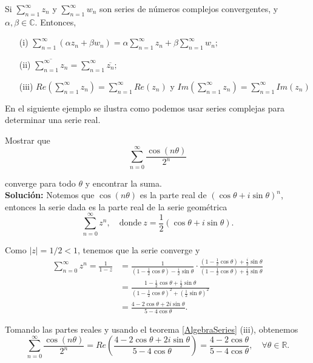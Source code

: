 \begin{teorema}\label{AlgebraSeries}
Si $\sum\limits_{n=1}^{\infty} z_n$ y $\sum\limits_{n=1}^{\infty} w_n$ son series de números complejos convergentes, y $\alpha,\beta \in \mathbb{C}$. Entonces,
\begin{itemize}
    \item[(i)] $\sum\limits_{n=1}^{\infty} (\alpha z_n + \beta w_n) = \alpha \sum\limits_{n=1}^{\infty} z_n + \beta \sum\limits_{n=1}^{\infty} w_n;$
    
    \item[(ii)] $\overline{\sum\limits_{n=1}^{\infty} z_n} =  \sum\limits_{n=1}^{\infty} \overline{z_n};$
    
    \item[(iii)] $Re\left(\sum\limits_{n=1}^{\infty} z_n\right) =\sum\limits_{n=1}^{\infty} Re(z_n)$ y $Im\left(\sum\limits_{n=1}^{\infty} z_n\right) =\sum\limits_{n=1}^{\infty} Im(z_n)$
\end{itemize}
\end{teorema}

En el siguiente ejemplo se ilustra como podemos usar series complejas para determinar una serie real.

\begin{ejemplo}
Mostrar que 
$$\sum_{n=0}^{\infty} \frac{\cos(n\theta)}{2^n}$$

converge para todo $\theta$ y encontrar la suma.
\\

\textbf{Solución:} Notemos que $\cos(n\theta)$ es la parte real de $(\cos\theta + i \sin \theta)^n$, entonces la serie dada es la parte real de la serie geométrica
$$\sum_{n=0}^{\infty} z^n, \quad \mbox{donde} ~ z = \frac{1}{2}(\cos \theta + i \sin \theta).$$

Como $|z| = 1/2 < 1$, tenemos que la serie converge y
\begin{align*}
 \sum_{n=0}^{\infty} z^n = \frac{1}{1-z} &= \frac{1}{\left(1 - \frac{1}{2} \cos \theta \right) - \frac{i}{2} \sin \theta } \cdot \frac{\left(1 - \frac{1}{2} \cos \theta \right) + \frac{i}{2} \sin \theta}{\left(1 - \frac{1}{2} \cos \theta \right) + \frac{i}{2} \sin \theta} \\
 &= \frac{1 - \frac{1}{2} \cos \theta  + \frac{i}{2} \sin \theta}{\left(1 - \frac{1}{2} \cos \theta \right)^2 + \left(\frac{1}{2} \sin \theta\right)^2} \\
 &= \frac{4-2\cos\theta+2i\sin\theta}{5-4\cos \theta}.
\end{align*}

Tomando las partes reales y usando el teorema \ref{AlgebraSeries} (iii), obtenemos 
$$\sum_{n=0}^{\infty} \frac{\cos(n\theta)}{2^n} = Re\left( \frac{4-2\cos\theta+2i\sin\theta}{5-4\cos \theta}\right) = \frac{4-2\cos \theta}{5-4\cos \theta}, \quad \forall\theta\in \mathbb{R}.$$
\end{ejemplo}

